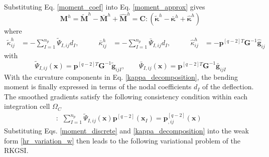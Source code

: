 Substituting Eq. \eqref{moment_coef} into Eq. \eqref{moment_approx} gives
\begin{equation}\label{moment_discrete}
	\boldsymbol M^h = \tilde{\boldsymbol M}^h - \bar{\boldsymbol M}^h + \hat{\boldsymbol M}^h = \boldsymbol C:(\tilde{\boldsymbol \kappa}^h - \bar{\boldsymbol \kappa}^h + \hat{\boldsymbol \kappa}^h)
\end{equation}
where
\begin{equation}\label{kappa_decomposition}
	\begin{aligned}
		\tilde\kappa^h_{ij}&=-\sum_{I=1}^{n_p}\tilde\Psi_{I,ij} d_I,&\qquad
		\bar\kappa^h_{ij}&=-\sum_{I=1}^{n_p}\bar \Psi_{I,ij} d_I,&\qquad
		\hat\kappa^h_{ij}&=-\boldsymbol p^{[q-2]T}\boldsymbol G^{-1}\hat{\boldsymbol g}_{ij}
	\end{aligned}
\end{equation}
with
\begin{equation}\label{smoothed_gradient}
	\tilde\Psi_{I,ij}(\boldsymbol x)=\boldsymbol p^{[q-2]T}\boldsymbol G^{-1}\tilde{\boldsymbol g}_{ijI},\qquad
	\bar \Psi_{I,ij}(\boldsymbol x)=\boldsymbol p^{[q-2]T}\boldsymbol G^{-1}\bar{\boldsymbol g}_{ijI}
\end{equation}
With the curvature components in Eq. \eqref{kappa_decomposition}, the bending moment is finally expressed in terms of the nodal coefficients $d_I$ of the deflection.
The smoothed gradients satisfy the following consistency condition \cite{} within each integration cell $\Omega_C$
\begin{equation}\label{consistency_hr}:
	\begin{aligned}
		\sum_{I=1}^{n_p}\tilde\Psi_{I,ij}(\boldsymbol x)\boldsymbol p^{[q-2]}(\boldsymbol x_I)=\boldsymbol p^{[q-2]}_{,ij}(\boldsymbol x)
	\end{aligned}
\end{equation}
Substituting Eqs. \eqref{moment_discrete} and \eqref{kappa_decomposition} into the weak form \eqref{hr_variation_w} then leads to the following variational problem of the RKGSI.


